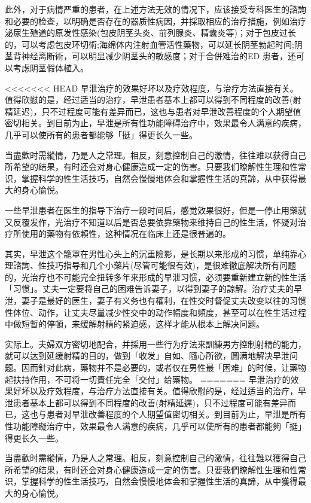 \documentclass[12pt,UTF8]{ctexbook}
\begin{document}
此外，对于病情严重的患者，在上述方法无效的情况下，应该接受专科医生的諮詢和必要的检查，以明确是否存在的器质性病因，并採取相应的治疗措施，例如治疗泌尿生殖道的原发性感染(包皮阴茎头炎、前列腺炎、精囊炎等)；对于包皮过长的，可以考虑包皮环切術;海绵体内注射血管活性藥物，可以延长阴茎勃起时间;阴茎背神经离断術，可以明显减少阴茎头的敏感度；对于合併难治的ED 患者，还可以考虑阴茎假体植入。

<<<<<<< HEAD
早泄治疗的效果好坏以及疗效程度，与治疗方法直接有关。值得欣慰的是，经过适当的治疗，早泄患者基本上都可以得到不同程度的改善(射精延迟)，只不过程度可能有差异而已，这也与患者对早泄改善程度的个人期望值密切相关。到目前为止，早泄是所有性功能障碍治疗中，效果最令人满意的疾病，几乎可以使所有的患者都能够「挺」得更长久一些。

当盡歡时需縱情，乃是人之常理。相反，刻意控制自己的激情，往往难以获得自己所希望的结果，有时还会对身心健康造成一定的伤害。只要我们瞭解性生理和性常识，掌握科学的性生活技巧，自然会慢慢地体会和掌握性生活的真諦，从中获得最大的身心愉悦。

一些早泄患者在医生的指导下治疗一段时间后，感觉效果很好，但是一停止用藥就又反覆发作，光治疗不知道以后是否总要依靠藥物来维持自己的性生活，怀疑对治疗所使用的藥物有依賴性，这种情况在临床上还是很普遍的。

其实，早泄这个籠罩在男性心头上的沉重險影，是长期以来形成的习惯，单纯靠心理諮詢、性技巧指导和几个小藥片(尽管可能很有效)，是很难徹底解决所有问题的，光治疗也不可能完全扭转多年来形成的早泄习惯，必须要重新建立新的性生活「习惯」。丈夫一定要将自己的困难告诉妻子，以得到妻子的諒解。治疗丈夫的早泄，妻子是最好的医生，妻子有义务也有權利，在性交时督促丈夫改变以往的习惯性体位、动作，让丈夫尽量减少性交中的动作幅度和頻度，甚至可以在性生活过程中做短暫的停頓，来缓解射精的紧迫感，这样才能从根本上解决问题。

实际上。夫婦双方密切地配合，并採用一些行为疗法来訓練男方控制射精的能力，就可以达到延缓射精的目的，做到「收发」自如、隨心所欲，圆满地解决早泄问题。因而針对此病，藥物并不是必要的，或者仅在男性最「困难」的时候，让藥物起扶持作用，不可将一切責任完全「交付」给藥物。
=======
早泄治疗的效果好坏以及疗效程度，与治疗方法直接有关。值得欣慰的是，经过适当的治疗，早泄患者基本上都可以得到不同程度的改善(射精延遲)，只不过程度可能有差异而已，这也与患者对早泄改善程度的个人期望值密切相关。到目前为止，早泄是所有性功能障礙治疗中，效果最令人满意的疾病，几乎可以使所有的患者都能夠「挺」得更长久一些。

当盡歡时需縱情，乃是人之常理。相反，刻意控制自己的激情，往往難以獲得自己所希望的结果，有时还会对身心健康造成一定的伤害。只要我們瞭解性生理和性常识，掌握科学的性生活技巧，自然会慢慢地体会和掌握性生活的真諦，从中獲得最大的身心愉悦。
\end{document}
